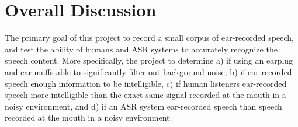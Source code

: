 % 
% 
% 

\chapter{Overall Discussion\label{chapter5}}


The primary goal of this project \DIFdelbegin {}\DIFdelend \DIFaddbegin {}\DIFaddend to record a small corpus of ear-recorded speech, and test the ability of humans and ASR systems to accurately recognize the speech content.  More specifically, the project \DIFdelbegin {}\DIFdelend \DIFaddbegin {}\DIFaddend to determine a) if \DIFdelbegin {}\DIFdelend using an earplug and ear muffs \DIFdelbegin {}\DIFdelend \DIFaddbegin {}\DIFaddend able to significantly filter out background noise, b) if ear-recorded speech \DIFdelbegin {}\DIFdelend \DIFaddbegin {}\DIFaddend enough information to be intelligible, c) if human listeners \DIFdelbegin {}\DIFdelend \DIFaddbegin {}\DIFaddend ear-recorded speech more intelligible than the exact same signal recorded at the mouth in a noisy environment, and d) if an ASR system \DIFdelbegin {}\DIFdelend \DIFaddbegin {}\DIFaddend ear-recorded speech \DIFdelbegin {}\DIFdelend than speech recorded at the mouth in a noisy environment. \DIFdelbegin %

